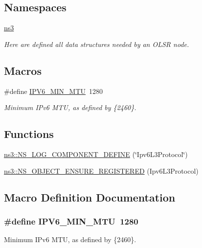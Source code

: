 \subsection*{Namespaces}
\begin{DoxyCompactItemize}
\item 
 \hyperlink{namespacens3}{ns3}
\begin{DoxyCompactList}\small\item\em Here are defined all data structures needed by an O\+L\+SR node. \end{DoxyCompactList}\end{DoxyCompactItemize}
\subsection*{Macros}
\begin{DoxyCompactItemize}
\item 
\#define \hyperlink{ipv6-l3-protocol_8cc_aa406701b90eb85102aab8f2bacd44c55}{I\+P\+V6\+\_\+\+M\+I\+N\+\_\+\+M\+TU}~1280
\begin{DoxyCompactList}\small\item\em Minimum I\+Pv6 M\+TU, as defined by \{2460\}. \end{DoxyCompactList}\end{DoxyCompactItemize}
\subsection*{Functions}
\begin{DoxyCompactItemize}
\item 
\hyperlink{namespacens3_a868c4a3f6c938275a6777db4fe89c2ac}{ns3\+::\+N\+S\+\_\+\+L\+O\+G\+\_\+\+C\+O\+M\+P\+O\+N\+E\+N\+T\+\_\+\+D\+E\+F\+I\+NE} (\char`\"{}Ipv6\+L3\+Protocol\char`\"{})
\item 
\hyperlink{namespacens3_a16d87ea31a282769e877006e1f7923f1}{ns3\+::\+N\+S\+\_\+\+O\+B\+J\+E\+C\+T\+\_\+\+E\+N\+S\+U\+R\+E\+\_\+\+R\+E\+G\+I\+S\+T\+E\+R\+ED} (Ipv6\+L3\+Protocol)
\end{DoxyCompactItemize}


\subsection{Macro Definition Documentation}
\subsubsection[{\texorpdfstring{I\+P\+V6\+\_\+\+M\+I\+N\+\_\+\+M\+TU}{IPV6_MIN_MTU}}]{\setlength{\rightskip}{0pt plus 5cm}\#define I\+P\+V6\+\_\+\+M\+I\+N\+\_\+\+M\+TU~1280}\hypertarget{ipv6-l3-protocol_8cc_aa406701b90eb85102aab8f2bacd44c55}{}\label{ipv6-l3-protocol_8cc_aa406701b90eb85102aab8f2bacd44c55}


Minimum I\+Pv6 M\+TU, as defined by \{2460\}. 

